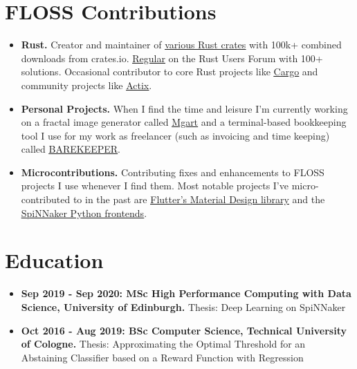 \documentclass[10pt]{article}
\begin{document}
\section*{FLOSS Contributions}

\begin{itemize}[label={}, leftmargin=*]

\item \textbf{Rust.} Creator and maintainer of
  \underline{\href{https://crates.io/users/jofas}{various Rust crates}}
  with 100k+ combined downloads from crates.io.
  \underline{\href{https://users.rust-lang.org/u/jofas/summary}{Regular}}
  on the Rust Users Forum with 100+ solutions.
  Occasional contributor to core Rust projects like
  \underline{\href{https://github.com/rust-lang/cargo}{Cargo}} and
  community projects like
  \underline{\href{https://github.com/actix/}{Actix}}.

\item \textbf{Personal Projects.} When I find the time and leisure I'm
  currently working on a fractal image generator called
  \underline{\href{https://github.com/jofas/mgart}{Mgart}}
  and a terminal-based bookkeeping tool I use for my work as
  freelancer (such as invoicing and time keeping) called
  \underline{\href{https://github.com/jofas/BAREKEEPER}{BAREKEEPER}}.

\item \textbf{Microcontributions.} Contributing fixes and enhancements
  to FLOSS projects I use whenever I find them.
  Most notable projects I've micro-contributed to in the past are
  \underline{\href{https://github.com/flutter/flutter}{Flutter's Material Design library}}
  and the
  \underline{\href{https://github.com/SpiNNakerManchester}{SpiNNaker Python frontends}}.

\end{itemize}

\section*{Education}

\begin{itemize}[label={}, leftmargin=*]

\item \textbf{Sep 2019 - Sep 2020: MSc High Performance Computing with Data
  Science, University of Edinburgh.} Thesis: Deep Learning on SpiNNaker

\item \textbf{Oct 2016 - Aug 2019: BSc Computer Science, Technical
  University of Cologne.} Thesis: Approximating the Optimal Threshold
  for an Abstaining Classifier based on a Reward Function with Regression

\end{itemize}
\end{document}
